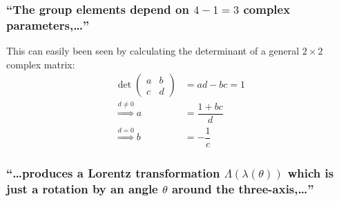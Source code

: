 \subsubsection{\enquote{The group elements depend on $4-1=3$ complex parameters,\dots} }
This can easily been seen by calculating the determinant of a general $2\times2$ complex matrix:
\begin{align*}
	\det(\begin{array}{cc}
		a&  b\\
		c& d
	\end{array})&=ad-bc=1\\
\overset{d\neq0}{\Rightarrow} a&=\dfrac{1+bc}{d}\\
\overset{d=0}{\Rightarrow} b&=-\dfrac{1}{c}
\end{align*}

\subsubsection{\enquote{\dots produces a Lorentz transformation $\Lambda(\lambda(\theta))$ which is just a rotation by an angle $\theta$ around the three-axis,\dots} }
